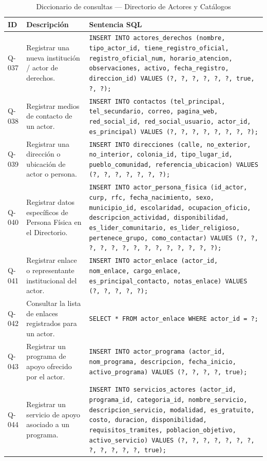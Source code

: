 \begin{table}[H]
	\centering
	\caption{Diccionario de consultas --- Directorio de Actores y Catálogos}
	\label{tab:consultas-actores}
	\footnotesize
	\begin{tabular}{l p{4.5cm} p{8.5cm}}
		\toprule
		\textbf{ID} & \textbf{Descripción} & \textbf{Sentencia SQL} \\
		\midrule
		Q-037 & Registrar una nueva institución / actor de derechos. & 
		\texttt{INSERT INTO actores\_derechos (nombre, tipo\_actor\_id, tiene\_registro\_oficial, registro\_oficial\_num, horario\_atencion, observaciones, activo, fecha\_registro, direccion\_id) VALUES (?, ?, ?, ?, ?, ?, true, ?, ?);} \\
		\addlinespace
		Q-038 & Registrar medios de contacto de un actor. & 
		\texttt{INSERT INTO contactos (tel\_principal, tel\_secundario, correo, pagina\_web, red\_social\_id, red\_social\_usuario, actor\_id, es\_principal) VALUES (?, ?, ?, ?, ?, ?, ?, ?);} \\
		\addlinespace
		Q-039 & Registrar una dirección o ubicación de actor o persona. & 
		\texttt{INSERT INTO direcciones (calle, no\_exterior, no\_interior, colonia\_id, tipo\_lugar\_id, pueblo\_comunidad, referencia\_ubicacion) VALUES (?, ?, ?, ?, ?, ?, ?);} \\
		\addlinespace
		Q-040 & Registrar datos específicos de Persona Física en el Directorio. & 
		\texttt{INSERT INTO actor\_persona\_fisica (id\_actor, curp, rfc, fecha\_nacimiento, sexo, municipio\_id, escolaridad, ocupacion\_oficio, descripcion\_actividad, disponibilidad, es\_lider\_comunitario, es\_lider\_religioso, pertenece\_grupo, como\_contactar) VALUES (?, ?, ?, ?, ?, ?, ?, ?, ?, ?, ?, ?, ?, ?);} \\
		\addlinespace
		Q-041 & Registrar enlace o representante institucional del actor. & 
		\texttt{INSERT INTO actor\_enlace (actor\_id, nom\_enlace, cargo\_enlace, es\_principal\_contacto, notas\_enlace) VALUES (?, ?, ?, ?, ?);} \\
		\addlinespace
		Q-042 & Consultar la lista de enlaces registrados para un actor. & 
		\texttt{SELECT * FROM actor\_enlace WHERE actor\_id = ?;} \\
		\addlinespace
		Q-043 & Registrar un programa de apoyo ofrecido por el actor. & 
		\texttt{INSERT INTO actor\_programa (actor\_id, nom\_programa, descripcion, fecha\_inicio, activo\_programa) VALUES (?, ?, ?, ?, true);} \\
		\addlinespace
		Q-044 & Registrar un servicio de apoyo asociado a un programa. & 
		\texttt{INSERT INTO servicios\_actores (actor\_id, programa\_id, categoria\_id, nombre\_servicio, descripcion\_servicio, modalidad, es\_gratuito, costo, duracion, disponibilidad, requisitos\_tramites, poblacion\_objetivo, activo\_servicio) VALUES (?, ?, ?, ?, ?, ?, ?, ?, ?, ?, ?, ?, true);} \\

\end{tabular}
\end{table}
